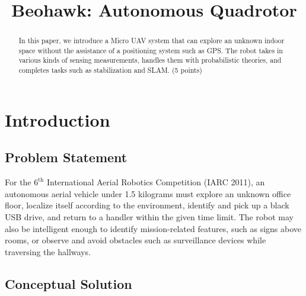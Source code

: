 \documentclass[12pt, letterpaper]{article}
\title{Beohawk: Autonomous Quadrotor}
\begin{document}
\maketitle
\begin{people}

\end{people}

\begin{abstract}
	In this paper, we introduce a Micro UAV system that can explore an unknown indoor space without the assistance of a positioning system such as GPS. The robot takes in various kinds of sensing measurements, handles them with probabilistic theories, and completes tasks such as stabilization and SLAM.  (5 points)
\end{abstract}

\section{Introduction}

\subsection{Problem Statement}

For the $6^\text{th}$ International Aerial Robotics Competition (IARC 2011), an autonomous aerial vehicle under 1.5 kilograms must explore an unknown office floor, localize itself according to the environment, identify and pick up a black USB drive, and return to a handler within the given time limit. The robot may also be intelligent enough to identify mission-related features, such as signs above rooms, or observe and avoid obstacles such as surveillance devices while traversing the hallways.

\subsection{Conceptual Solution}
\end{document}
